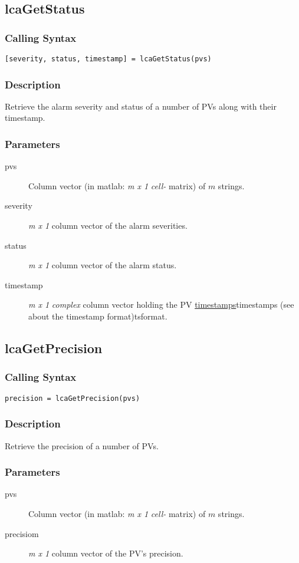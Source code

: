 \documentclass{article}
\newcommand{\pbrk}{\pagebreak[3]}
\newcommand{\pbrkf}{\pagebreak}
\newcommand{\ita}[1]{\emph{#1}}
\newcommand{\m}{$m$}
\newcommand{\mhack}{$m$} %
\newcommand{\mxl}{$m\times 1$}
\renewcommand{\m}{\ita{m}}
\newcommand{\mhack}{\ita{m}} %
\renewcommand{\mxl}{\ita{m x 1}}
\renewcommand{\pbrk}{}
\renewcommand{\pbrkf}{}
\newcommand{\PVITEM}{
\item[pvs] Column vector (in matlab: \mxl{} \ita{cell-} matrix)
of \mhack{} strings.
}
\begin{document}
\pbrk
\subsection{lcaGetStatus}
\subsubsection{Calling Syntax}
\begin{verbatim}
[severity, status, timestamp] = lcaGetStatus(pvs)
\end{verbatim}
\subsubsection{Description}
Retrieve the alarm severity and status of a number of PVs along
with their timestamp.
\subsubsection{Parameters}
\begin{description}
\PVITEM
\item[severity] \mxl{} column vector of the alarm severities.
\item[status] \mxl{} column vector of the alarm status.
\item[timestamp] \mxl{} \ita{complex} column vector holding the
PV \hyperref[ref]{timestamps}{timestamps (see }{ about the timestamp format)}{tsformat}.
\end{description}


\pbrkf
\subsection{lcaGetPrecision}
\subsubsection{Calling Syntax}
\begin{verbatim}
precision = lcaGetPrecision(pvs)
\end{verbatim}
\subsubsection{Description}
Retrieve the precision of a number of PVs.
\subsubsection{Parameters}
\begin{description}
\PVITEM
\item[precisiom] \mxl{} column vector of the PV's precision.
\end{description}
\end{document}
